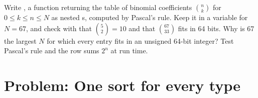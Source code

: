 \begin{exercise}[$\star\star\star$]\label{exo:b2:cpp-templates:12}
Write , a  function returning the table of binomial coefficients $\binom{n}{k}$ for
$0 \leq k \leq n \leq N$ as nested s, computed by Pascal's rule. Keep it in a 
variable for $N = 67$, and check with  that $\binom{5}{2} = 10$ and that $\binom{67}{33}$ fits in 64
bits. Why is 67 the largest $N$ for which every entry fits in an unsigned 64-bit integer? Test Pascal's rule and the
row sums $2^n$ at run time.
\end{exercise}

\section{Problem: One sort for every type}\label{sec:b2:cpp-templates:problem}

